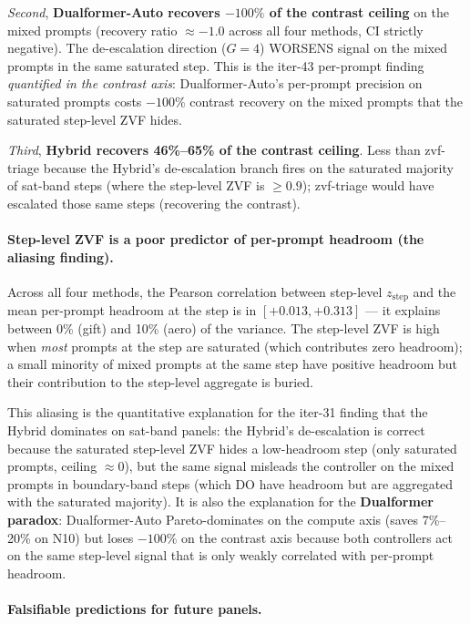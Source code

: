 \documentclass{article}
\begin{document}
\emph{Second}, \textbf{Dualformer-Auto recovers $-100\%$ of the
contrast ceiling} on the mixed prompts (recovery ratio $\approx -1.0$
across all four methods, CI strictly negative). The de-escalation
direction ($G{=}4$) WORSENS signal on the mixed prompts in the same
saturated step. This is the iter-43 per-prompt finding \emph{quantified
in the contrast axis}: Dualformer-Auto's per-prompt precision on
saturated prompts costs $-100\%$ contrast recovery on the mixed
prompts that the saturated step-level ZVF hides.

\emph{Third}, \textbf{Hybrid recovers 46\%--65\% of the contrast
ceiling}. Less than zvf-triage because the Hybrid's de-escalation
branch fires on the saturated majority of sat-band steps (where the
step-level ZVF is $\ge 0.9$); zvf-triage would have escalated those
same steps (recovering the contrast).

\paragraph{Step-level ZVF is a poor predictor of per-prompt headroom
(the aliasing finding).} Across all four methods, the Pearson
correlation between step-level $z_{\mathrm{step}}$ and the
mean per-prompt headroom at the step is in $[+0.013, +0.313]$ --- it
explains between 0\% (gift) and 10\% (aero) of the variance. The
step-level ZVF is high when \emph{most} prompts at the step are
saturated (which contributes zero headroom); a small minority of
mixed prompts at the same step have positive headroom but their
contribution to the step-level aggregate is buried.

This aliasing is the quantitative explanation for the iter-31 finding
that the Hybrid dominates on sat-band panels: the Hybrid's
de-escalation is correct because the saturated step-level ZVF hides
a low-headroom step (only saturated prompts, ceiling $\approx 0$), but
the same signal misleads the controller on the mixed prompts in
boundary-band steps (which DO have headroom but are aggregated with
the saturated majority). It is also the explanation for the
\textbf{Dualformer paradox}: Dualformer-Auto Pareto-dominates on the
compute axis (saves 7\%--20\% on N10) but loses $-100\%$ on the
contrast axis because both controllers act on the same step-level
signal that is only weakly correlated with per-prompt headroom.

\paragraph{Falsifiable predictions for future panels.}
\end{document}

